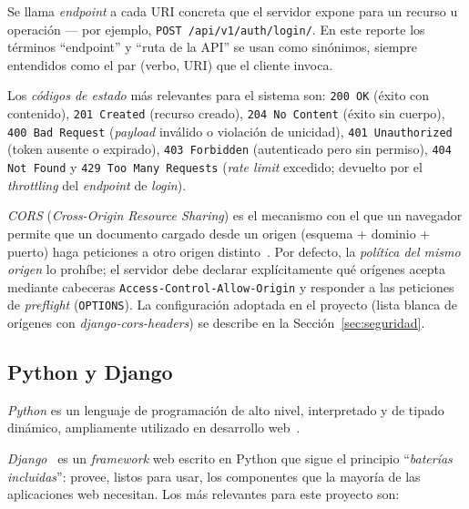 Se llama \emph{endpoint} a cada URI concreta que el servidor expone para un recurso u operación --- por ejemplo, \texttt{POST /api/v1/auth/login/}. En este reporte los términos ``endpoint'' y ``ruta de la API'' se usan como sinónimos, siempre entendidos como el par (verbo, URI) que el cliente invoca.

Los \emph{códigos de estado} más relevantes para el sistema son: \texttt{200 OK} (éxito con contenido), \texttt{201 Created} (recurso creado), \texttt{204 No Content} (éxito sin cuerpo), \texttt{400 Bad Request} (\emph{payload} inválido o violación de unicidad), \texttt{401 Unauthorized} (token ausente o expirado), \texttt{403 Forbidden} (autenticado pero sin permiso), \texttt{404 Not Found} y \texttt{429 Too Many Requests} (\emph{rate limit} excedido; devuelto por el \emph{throttling} del \emph{endpoint} de \emph{login}).

\emph{CORS} (\emph{Cross-Origin Resource Sharing}) es el mecanismo con el que un navegador permite que un documento cargado desde un origen (esquema + dominio + puerto) haga peticiones a otro origen distinto~\cite{fetch2024}. Por defecto, la \emph{política del mismo origen} lo prohíbe; el servidor debe declarar explícitamente qué orígenes acepta mediante cabeceras \texttt{Access-Control-Allow-Origin} y responder a las peticiones de \emph{preflight} (\texttt{OPTIONS}). La configuración adoptada en el proyecto (lista blanca de orígenes con \emph{django-cors-headers}) se describe en la Sección~\ref{sec:seguridad}.

\subsection{Python y Django}

\emph{Python} es un lenguaje de programación de alto nivel, interpretado y de tipado dinámico, ampliamente utilizado en desarrollo web~\cite{python2024}.

\emph{Django}~\cite{django2024} es un \emph{framework} web escrito en Python que sigue el principio ``\emph{baterías incluidas}'': provee, listos para usar, los componentes que la mayoría de las aplicaciones web necesitan. Los más relevantes para este proyecto son:

